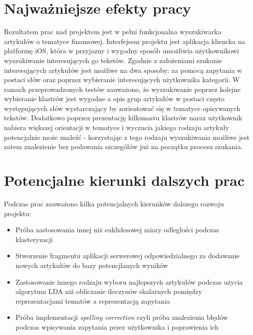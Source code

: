 \section{Najważniejsze efekty pracy}
Rezultatem prac nad projektem jest w pełni funkcjonalna wyszukiwarka artykułów o tematyce finansowej. Interfejsem projektu jest aplikacja kliencka na platformę iOS, która w przyjazny i wygodny sposób umożliwia użytkownikowi wyszukiwanie interesujących go tekstów. Zgodnie z założeniami szukanie interesujących artykułów jest możliwe na dwa sposoby: za pomocą zapytania w postaci słów oraz poprzez wybieranie interesujących użytkownika kategorii. W ramach przeprowadzonych testów zauważono, że wyszukiwanie poprzez kolejne wybieranie klastrów jest wygodne a opis grup artykułów w postaci często występujących słów wystarczający by zorientować się w tematyce opisywanych tekstów. Dodatkowo poprzez prezentację kilkunastu klastrów naraz użytkownik nabiera większej orientacji w tematyce i wyczucia jakiego rodzaju artykuły potencjalnie może znaleźć - korzystając z tego rodzaju wyszukiwania możliwe jest zatem znalezienie bez podawania szczegółów już na początku procesu szukania.

\section{Potencjalne kierunki dalszych prac}
Podczas prac zauważono kilka potencjalnych kierunków dalszego rozwoju projektu:

\begin{itemize}
\item Próba zastosowania innej niż euklidesowej miary odległości podczas klasteryzacji
\item Stworzenie fragmentu aplikacji serwerowej odpowiedzialnego za dodawanie nowych artykułów do bazy potencjlanych wyników
\item Zastosowanie innego rodzaju wyboru najlepszych artykułów podczas użycia algorytmu LDA niż obliczanie iloczynów skalarnych pomiędzy reprezentacjami tematów a reprezentacją zapytania
\item Próba implementacji \textit{spelling correction} czyli próba znalezienia błędów podczas wpisywania zapytania przez użytkownika i poprawienia ich
\end{itemize}